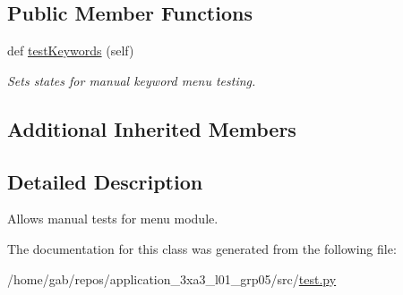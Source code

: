 \subsection*{Public Member Functions}
\begin{DoxyCompactItemize}
\item 
\mbox{\label{classtest_1_1menuTest_ae1cdbb707ce790e78ef41f45871d7e04}} 
def \hyperlink{classtest_1_1menuTest_ae1cdbb707ce790e78ef41f45871d7e04}{test\+Keywords} (self)
\begin{DoxyCompactList}\small\item\em Sets states for manual keyword menu testing. \end{DoxyCompactList}\end{DoxyCompactItemize}
\subsection*{Additional Inherited Members}


\subsection{Detailed Description}
Allows manual tests for menu module. 

The documentation for this class was generated from the following file\+:\begin{DoxyCompactItemize}
\item 
/home/gab/repos/application\+\_\+3xa3\+\_\+l01\+\_\+grp05/src/\hyperlink{test_8py}{test.\+py}\end{DoxyCompactItemize}

